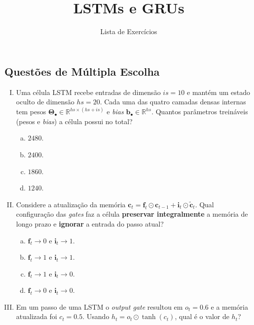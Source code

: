 \documentclass{dlproblemset}
\title{LSTMs e GRUs}
\subtitle{Lista de Exercícios}
\begin{document}
\subsection*{Questões de Múltipla Escolha}

\begin{enumerate}[I)]

\item Uma célula LSTM recebe entradas de dimensão $is = 10$ e mantém um estado oculto de
dimensão $hs = 20$. Cada uma das quatro camadas densas internas tem pesos
$\mathbf{\Theta}_\bullet \in \mathbb{R}^{hs \times (hs + is)}$ e \textit{bias}
$\mathbf{b}_\bullet \in \mathbb{R}^{hs}$. Quantos parâmetros treináveis (pesos e \textit{bias})
a célula possui no total?

\begin{enumerate}[a)]
    \item $2480$.
    \item $2400$.
    \item $1860$.
    \item $1240$.
\end{enumerate}

\item Considere a atualização da memória $\mathbf{c}_t = \mathbf{f}_t \odot \mathbf{c}_{t-1} + \mathbf{i}_t \odot \tilde{\mathbf{c}}_t$.
Qual configuração das \textit{gates} faz a célula \textbf{preservar integralmente} a memória
de longo prazo e \textbf{ignorar} a entrada do passo atual?

\begin{enumerate}[a)]
    \item $\mathbf{f}_t \to 0$ e $\mathbf{i}_t \to 1$.
    \item $\mathbf{f}_t \to 1$ e $\mathbf{i}_t \to 1$.
    \item $\mathbf{f}_t \to 1$ e $\mathbf{i}_t \to 0$.
    \item $\mathbf{f}_t \to 0$ e $\mathbf{i}_t \to 0$.
\end{enumerate}

\item Em um passo de uma LSTM o \textit{output gate} resultou em $o_t = 0.6$ e a memória
atualizada foi $c_t = 0.5$. Usando $h_t = o_t \odot \tanh(c_t)$, qual é o valor de $h_t$?


\end{enumerate}
\end{document}
